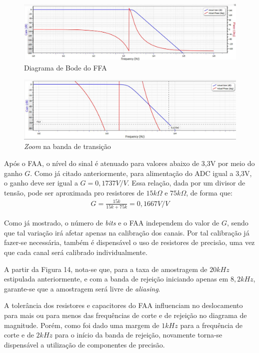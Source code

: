\documentclass[
	12pt,				%
	openright,			%
	twoside,			%
	a4paper,			%
	english,			%
	french,				%
	spanish,			%
	brazil,				%
	]{abntex2}
\begin{document}
			\begin{figure}[!ht]
				\centering
				\includegraphics[width=\linewidth]{../Fotos/filterProGF.jpg}
				\caption{Diagrama de Bode do FFA}
			\end{figure}

			\begin{figure}[!ht]
				\centering
				\includegraphics[width=\linewidth]{../Fotos/filterProZoom.jpg}
				\caption{\textit{Zoom} na banda de transição}
			\end{figure}

			Após o FAA, o nível do sinal é atenuado para valores abaixo de
			3,3V por meio do ganho $G$. Como já citado anteriormente, para
			alimentação do ADC igual  a 3,3V, o ganho deve ser igual a $G =
			0,1737V/V$. Essa relação, dada por um divisor de tensão, pode
			ser aproximada pro resistores de $15k\Omega$ e $75k\Omega$, de
			forma que:
			\begin{gather*}
				G = \frac{15k}{15k+75k} = 0,1667V/V
			\end{gather*}

			Como já mostrado, o número de \textit{bits} e o FAA independem do valor
			de $G$, sendo que tal variação irá afetar apenas na calibração dos
			canais. Por tal calibração já fazer-se necessária, também é
			dispensável o uso de resistores de precisão, uma vez que cada
			canal será calibrado individualmente.

			A partir da Figura 14, nota-se que, para a taxa de amostragem de
			$20kHz$ estipulada anteriormente, e com a banda de rejeição
			iniciando apenas em $8,2kHz$, garante-se que a amostragem será
			livre de \textit{aliasing}.

			A tolerância dos resistores e capacitores do FAA influenciam no
			deslocamento para mais ou para menos das frequências de corte e
			de rejeição no diagrama de magnitude. Porém, como foi dado uma
			margem de $1kHz$ para a frequência de corte e de $2kHz$ para o
			início da banda de rejeição, novamente torna-se dispensável a
			utilização de componentes de precisão.
\end{document}
